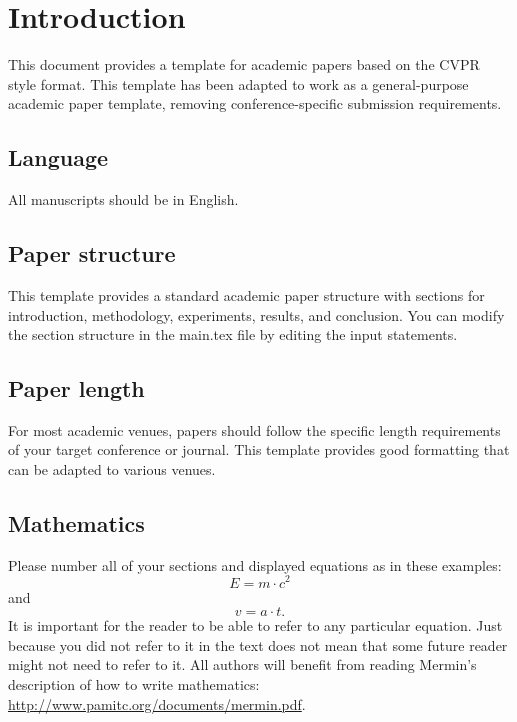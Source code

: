 \section{Introduction}
\label{sec:intro}

This document provides a template for academic papers based on the CVPR style format.
This template has been adapted to work as a general-purpose academic paper template, removing conference-specific submission requirements.

\subsection{Language}

All manuscripts should be in English.

\subsection{Paper structure}
This template provides a standard academic paper structure with sections for introduction, methodology, experiments, results, and conclusion.
You can modify the section structure in the main.tex file by editing the input statements.

\subsection{Paper length}
For most academic venues, papers should follow the specific length requirements of your target conference or journal.
This template provides good formatting that can be adapted to various venues.


\subsection{Mathematics}

Please number all of your sections and displayed equations as in these examples:
\begin{equation}
  E = m\cdot c^2
  \label{eq:important}
\end{equation}
and
\begin{equation}
  v = a\cdot t.
  \label{eq:also-important}
\end{equation}
It is important for the reader to be able to refer to any particular equation.
Just because you did not refer to it in the text does not mean that some future reader might not need to refer to it.
All authors will benefit from reading Mermin's description of how to write mathematics:
\url{http://www.pamitc.org/documents/mermin.pdf}.

